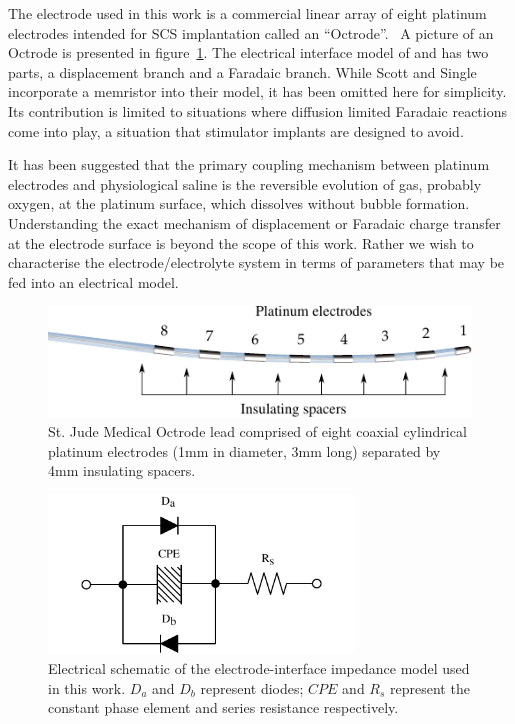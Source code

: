 \documentclass[journal, a4paper]{IEEEtran}
\begin{document}
The electrode used in this work is a commercial linear array of eight platinum electrodes intended for SCS implantation called an ``Octrode''.~\cite{StJudeOctrode} A picture of an Octrode is presented in figure~\ref{fig:octrode}.
The electrical interface model of \cite{Franks2005} and \cite{ScottSingle2013} has two parts, a displacement branch and a Faradaic branch. While Scott and Single \cite{ScottSingle2013} incorporate a memristor into their model, it has been omitted here for simplicity. Its contribution is limited to situations where diffusion limited Faradaic reactions come into play, a situation that stimulator implants are designed to avoid.

It has been suggested that the primary coupling mechanism between platinum electrodes and physiological saline is the reversible evolution of gas, probably oxygen, at the platinum surface, which dissolves without bubble formation.\cite{Greatbatch1969} Understanding the exact mechanism of displacement or Faradaic charge transfer at the electrode surface is beyond the scope of this work. Rather we wish to characterise the electrode/electrolyte system in terms of parameters that may be fed into an electrical model.

\begin{figure}
    \begin{center}
    \includegraphics{graphics/StJudeOctrodeDiagram}
    \end{center}
    \caption{St. Jude Medical Octrode lead comprised of eight coaxial cylindrical platinum electrodes (1mm in diameter, 3mm long) separated by 4mm insulating spacers.}
    \label{fig:octrode}
\end{figure}

\begin{figure}
    \begin{center}
        \includegraphics[width=230pt]{graphics/interfaceSchematic_noMemristive}
    \end{center}
    \caption{Electrical schematic of the electrode-interface impedance model used in this work. $D_{a}$ and $D_{b}$ represent diodes; $CPE$ and $R_{s}$ represent the constant phase element and series resistance respectively.}
    \label{fig:schematic}
\end{figure}
\end{document}
